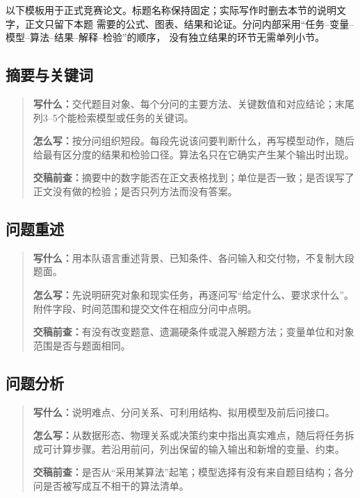 \documentclass[UTF8,zihao=-4]{ctexart}
\begin{document}
以下模板用于正式竞赛论文。标题名称保持固定；实际写作时删去本节的说明文字，正文只留下本题
需要的公式、图表、结果和论证。分问内部采用“任务--变量--模型--算法--结果--解释--检验”的顺序，
没有独立结果的环节无需单列小节。

\subsection{摘要与关键词}
\begin{quote}\small
\noindent\textbf{\color{inkblue}写什么：}交代题目对象、每个分问的主要方法、关键数值和对应结论；末尾列3--5个能检索模型或任务的关键词。\par
\noindent\textbf{\color{inkblue}怎么写：}按分问组织短段。每段先说该问要判断什么，再写模型动作，随后给最有区分度的结果和检验口径。算法名只在它确实产生某个输出时出现。\par
\noindent\textbf{\color{inkblue}交稿前查：}摘要中的数字能否在正文表格找到；单位是否一致；是否误写了正文没有做的检验；是否只列方法而没有答案。
\end{quote}

\subsection{问题重述}
\begin{quote}\small
\noindent\textbf{\color{inkblue}写什么：}用本队语言重述背景、已知条件、各问输入和交付物，不复制大段题面。\par
\noindent\textbf{\color{inkblue}怎么写：}先说明研究对象和现实任务，再逐问写“给定什么、要求求什么”。附件字段、时间范围和提交文件在相应分问中点明。\par
\noindent\textbf{\color{inkblue}交稿前查：}有没有改变题意、遗漏硬条件或混入解题方法；变量单位和对象范围是否与题面相同。
\end{quote}

\subsection{问题分析}
\begin{quote}\small
\noindent\textbf{\color{inkblue}写什么：}说明难点、分问关系、可利用结构、拟用模型及前后问接口。\par
\noindent\textbf{\color{inkblue}怎么写：}从数据形态、物理关系或决策约束中指出真实难点，随后将任务拆成可计算步骤。若沿用前问，列出保留的输入输出和新增的变量、约束。\par
\noindent\textbf{\color{inkblue}交稿前查：}是否从“采用某算法”起笔；模型选择有没有来自题目结构；各分问是否被写成互不相干的算法清单。
\end{quote}
\end{document}
